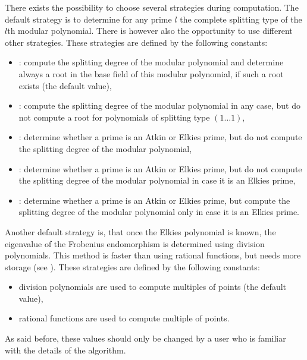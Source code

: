 There exists the possibility to choose several strategies during computation.  The default
strategy is to determine for any prime $l$ the complete splitting type of the $l$th modular
polynomial.  There is however also the opportunity to use different other strategies.  These
strategies are defined by the following constants:
\begin{itemize}
\item {}: compute the splitting degree of the modular polynomial
  and determine always a root in the base field of this modular polynomial, if such a root
  exists (the default value),
\item {}: compute the splitting degree of the modular polynomial in any
  case, but do not compute a root for polynomials of splitting type $(1\ldots 1)$,
\item {}: determine whether a prime is an Atkin or Elkies prime, but
  do not compute the splitting degree of the modular polynomial,
\item {}: determine whether a prime is an Atkin or Elkies prime,
  but do not compute the splitting degree of the modular polynomial in case it is an Elkies
  prime,
\item {}: determine whether a prime is an Atkin or Elkies prime,
  but compute the splitting degree of the modular polynomial only in case it is an Elkies prime.
\end{itemize}
Another default strategy is, that once the Elkies polynomial is known, the eigenvalue of the
Frobenius endomorphism is determined using division polynomials.  This method is faster than
using rational functions, but needs more storage (see \cite{Maurer_Thesis:1994}).  These
strategies are defined by the following constants:
\begin{itemize}
\item {} division polynomials are used to compute multiples of points
  (the default value),
\item {} rational functions are used to compute multiple of points.
\end{itemize}
As said before, these values should only be changed by a user who is familiar with the details
of the algorithm.



\CONS

